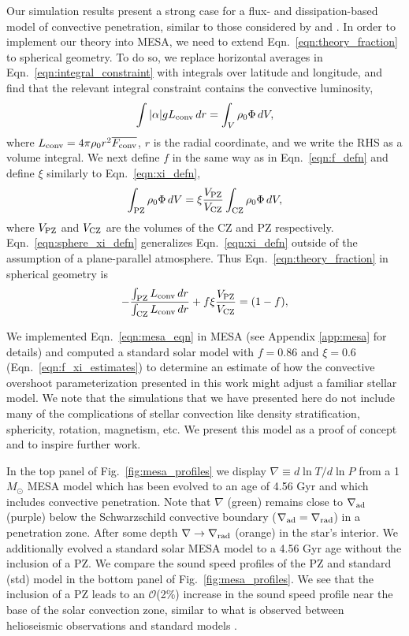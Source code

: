 \documentclass[twocolumn]{aastex631}
\newcommand{\gradrad}{\ensuremath{\nabla_{\rm{rad}}}}
\newcommand{\gradad}{\ensuremath{\nabla_{\rm{ad}}}}
\newcommand{\justgrad}{\ensuremath{\nabla}}
\renewcommand{\bar}[1]{\overline{#1}}
\begin{document}
Our simulation results present a strong case for a flux- and dissipation-based model of convective penetration, similar to those considered by \citet{zahn1991} and \citet{roxburgh1989}.
In order to implement our theory into MESA, we need to extend Eqn.~\ref{eqn:theory_fraction} to spherical geometry.
To do so, we replace horizontal averages in Eqn.~\ref{eqn:integral_constraint} with integrals over latitude and longitude, and find that the relevant integral constraint contains the convective luminosity,
\begin{equation}
\int |\alpha| g L_{\rm{conv}}\,dr =   \int_V \rho_0 \Phi\,dV,
\end{equation}
where $L_{\rm{conv}} = 4\pi\rho_0 r^2 \bar{F_{\rm{conv}}}$, $r$ is the radial coordinate, and we write the RHS as a volume integral.
We next define $f$ in the same way as in Eqn.~\ref{eqn:f_defn} and define $\xi$ similarly to Eqn.~\ref{eqn:xi_defn},
\begin{equation}
\int_{\rm{PZ}} \rho_0 \Phi \,dV = \xi \frac{V_{\rm{PZ}}}{V_{\rm{CZ}}}\int_{\rm{CZ}}\rho_0 \Phi \, dV,
\label{eqn:sphere_xi_defn}
\end{equation}
where $V_{\rm{PZ}}$ and $V_{\rm{CZ}}$ are the volumes of the CZ and PZ respectively.
Eqn.~\ref{eqn:sphere_xi_defn} generalizes Eqn.~\ref{eqn:xi_defn} outside of the assumption of a plane-parallel atmosphere.
Thus Eqn.~\ref{eqn:theory_fraction} in spherical geometry is
\begin{equation}
-\frac{\int_{\rm{PZ}} L_{\rm{conv}}\,dr}{\int_{\rm{CZ}} L_{\rm{conv}}\,dr} + f \xi \frac{V_{\rm{PZ}}}{V_{\rm{CZ}}} = (1 - f),
\label{eqn:mesa_eqn}
\end{equation}

We implemented Eqn.~\ref{eqn:mesa_eqn} in MESA (see Appendix \ref{app:mesa} for details) and computed a standard solar model with $f = 0.86$ and $\xi = 0.6$ (Eqn.~\ref{eqn:f_xi_estimates}) to determine an estimate of how the convective overshoot parameterization presented in this work might adjust a familiar stellar model.
We note that the simulations that we have presented here do not include many of the complications of stellar convection like density stratification, sphericity, rotation, magnetism, etc.
We present this model as a proof of concept and to inspire further work.

In the top panel of Fig.~\ref{fig:mesa_profiles} we display $\justgrad \equiv d\ln T/d\ln P$ from a 1 $M_\odot$ MESA model which has been evolved to an age of 4.56 Gyr and which includes convective penetration.
Note that $\justgrad$ (green) remains close to $\gradad$ (purple) below the Schwarzschild convective boundary ($\gradad = \gradrad$) in a penetration zone.
After some depth $\justgrad \rightarrow \gradrad$ (orange) in the star's interior.
We additionally evolved a standard solar MESA model to a 4.56 Gyr age without the inclusion of a PZ.
We compare the sound speed profiles of the PZ and standard (std) model in the bottom panel of Fig.~\ref{fig:mesa_profiles}.
We see that the inclusion of a PZ leads to an $\mathcal{O}$(2\%) increase in the sound speed profile near the base of the solar convection zone, similar to what is observed between helioseismic observations and standard models \citep{bergemann_serenelli_2014}.
\end{document}
